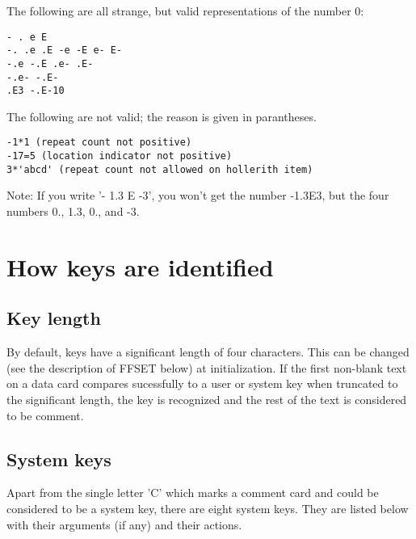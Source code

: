 The following are all strange, but valid representations of the number 0:
 
\begin{verbatim}
- . e E
-. .e .E -e -E e- E-
-.e -.E .e- .E-
-.e- -.E-
.E3 -.E-10
\end{verbatim}
 
The following are not valid; the reason is given in parantheses.
 
\begin{verbatim}
-1*1 (repeat count not positive)
-17=5 (location indicator not positive)
3*'abcd' (repeat count not allowed on hollerith item)
\end{verbatim}
 
Note: If you write '- 1.3 E -3', you won't get the number -1.3E3, but the
four numbers 0., 1.3, 0., and -3.
 
 
\chapter{How keys are identified}
 
\section{Key length}
 
By default, keys have a significant length of four characters. This can be
changed (see the description of FFSET below) at initialization. If the first
non-blank text on a data card compares sucessfully to a user or system key
when truncated to the significant length, the key is recognized and the rest
of the text is considered to be comment.
 
\section{System keys}
 
Apart from the single letter 'C' which marks a comment card and could be
considered to be a system key, there are eight system keys. They are listed
below with their arguments (if any) and their actions.
 
